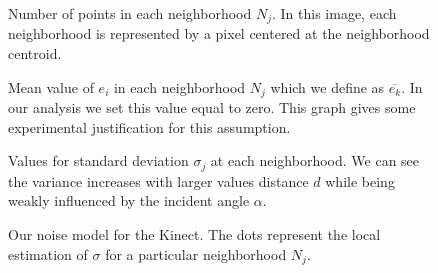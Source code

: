 \setlength{} 
\setlength{}
\begin{figure}[p]
\centering 
{} 
 
\endpgfgraphicnamed 
\caption{ 
Number of points in each neighborhood $N_j$. In this image, each neighborhood is represented by a pixel centered at the neighborhood centroid. 
} 
\label{fig:numberOfPointsPerBin}
\end{figure} 

\setlength{} 
\setlength{}
\begin{figure}[p]
\centering 
{} 
 
\endpgfgraphicnamed 
\caption{ 
Mean value of $e_i$ in each neighborhood $N_j$ which we define as $\overline{e_k}$. In our analysis we set this value equal to zero. This graph gives some experimental justification for this assumption.   
} 
\label{fig:sampleMeanFigure}
\end{figure} 

\setlength{} 
\setlength{}
\begin{figure}[p]
\centering 
{} 
 
\endpgfgraphicnamed 
\caption{ 
Values for standard deviation $\sigma_j$ at each neighborhood. We can see the variance increases with larger values distance $d$ while being weakly influenced by the incident angle $\alpha$.
} 
\label{fig:stdImageZeroMean}
\end{figure} 

% 

\pgfplotsset{xlabel shift = -1ex}
\pgfplotsset{ylabel shift = -1ex}
\setlength{} 
\setlength{}
\begin{figure}[p]
\centering 
{} 
 
\endpgfgraphicnamed 
\caption{ 
Our noise model for the Kinect. The dots represent the local estimation of $\sigma$ for a particular neighborhood $N_j$. 
} 
\label{fig:scatterWithZeroMean}
\end{figure} 


